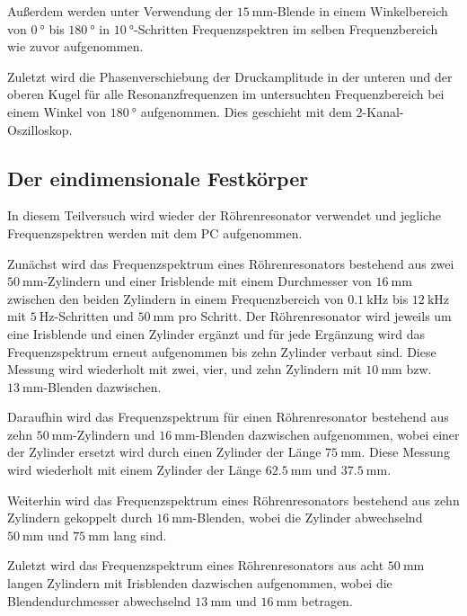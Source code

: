 Außerdem werden unter Verwendung der $\SI{15}{\milli\metre}$-Blende in einem Winkelbereich von $\SI{0}{\degree}$ bis $\SI{180}{\degree}$ in $\SI{10}{\degree}$-Schritten Frequenzspektren im selben Frequenzbereich wie zuvor aufgenommen.

Zuletzt wird die Phasenverschiebung der Druckamplitude in der unteren und der oberen Kugel für alle Resonanzfrequenzen im untersuchten Frequenzbereich bei einem Winkel von $\SI{180}{\degree}$ aufgenommen. Dies geschieht mit dem 2-Kanal-Oszilloskop.

\subsection{Der eindimensionale Festkörper}
In diesem Teilversuch wird wieder der Röhrenresonator verwendet und jegliche Frequenzspektren werden mit dem PC aufgenommen.

Zunächst wird das Frequenzspektrum eines Röhrenresonators bestehend aus zwei $\SI{50}{\milli\metre}$-Zylindern und einer Irisblende mit einem Durchmesser von $\SI{16}{\milli\metre}$ zwischen den beiden Zylindern in einem Frequenzbereich von $\SI{0.1}{\kilo\hertz}$ bis $\SI{12}{\kilo\hertz}$ mit $\SI{5}{\hertz}$-Schritten und $\SI{50}{\milli\metre}$ pro Schritt. Der Röhrenresonator wird jeweils um eine Irisblende und einen Zylinder ergänzt und für jede Ergänzung wird das Frequenzspektrum erneut aufgenommen bis zehn Zylinder verbaut sind.
Diese Messung wird wiederholt mit zwei, vier, und zehn Zylindern mit $\SI{10}{\milli\metre}$ bzw. $\SI{13}{\milli\metre}$-Blenden dazwischen.

Daraufhin wird das Frequenzspektrum für einen Röhrenresonator bestehend aus zehn $\SI{50}{\milli\metre}$-Zylindern und $\SI{16}{\milli\metre}$-Blenden dazwischen aufgenommen, wobei einer der Zylinder ersetzt wird durch einen Zylinder der Länge $\SI{75}{\milli\metre}$. Diese Messung wird wiederholt mit einem Zylinder der Länge $\SI{62.5}{\milli\metre}$ und $\SI{37.5}{\milli\metre}$.

Weiterhin wird das Frequenzspektrum eines Röhrenresonators bestehend aus zehn Zylindern gekoppelt durch $\SI{16}{\milli\metre}$-Blenden, wobei die Zylinder abwechselnd $\SI{50}{\milli\metre}$ und $\SI{75}{\milli\metre}$ lang sind.

Zuletzt wird das Frequenzspektrum eines Röhrenresonators aus acht $\SI{50}{\milli\metre}$ langen Zylindern mit Irisblenden dazwischen aufgenommen, wobei die Blendendurchmesser abwechselnd $\SI{13}{\milli\metre}$ und $\SI{16}{\milli\metre}$ betragen.
